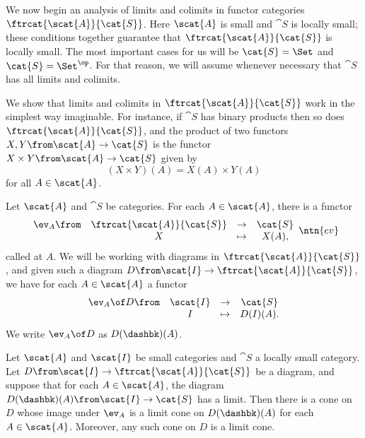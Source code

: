 We now begin an analysis of limits and colimits in functor categories
$\ftrcat{\scat{A}}{\cat{S}}$.  Here $\scat{A}$ is small and $\cat{S}$ is
locally small; these conditions together guarantee that
$\ftrcat{\scat{A}}{\cat{S}}$ is locally small.  The most important cases
for us will be $\cat{S} = \Set$ and $\cat{S} = \Set^\op$.  For that reason,
we will assume whenever necessary that $\cat{S}$ has all limits and
colimits.

We show that limits and colimits in $\ftrcat{\scat{A}}{\cat{S}}$ work in
the simplest way imaginable.  For instance, if $\cat{S}$ has binary products
then so does $\ftrcat{\scat{A}}{\cat{S}}$, and the product%
%
%
of two functors $X, Y\from \scat{A} \to \cat{S}$ is the functor $X \times
Y\from \scat{A} \to \cat{S}$ given by
\[
(X \times Y)(A) = X(A) \times Y(A)
\]
for all $A \in \scat{A}$.  

\begin{notn}
Let $\scat{A}$ and $\cat{S}$ be categories.  For each $A \in \scat{A}$, there
is a functor
\[
\begin{array}{cccc}
\ev_A\from      &\ftrcat{\scat{A}}{\cat{S}}     &
\to             &\cat{S}        \\
                &X                              &
\mapsto         &X(A),
\end{array}%
%
\ntn{ev}
%
\]
called %
%
%
at $A$.  We will be working with diagrams in $\ftrcat{\scat{A}}{\cat{S}}$,
and given such a diagram $D\from \scat{I} \to \ftrcat{\scat{A}}{\cat{S}}$,
we have for each $A \in \scat{A}$ a functor
\[
\begin{array}{cccc}
\ev_A \of D\from&\scat{I}       &\to            &\cat{S}        \\
                &I              &\mapsto        &D(I)(A).        
\end{array}
\]
We write $\ev_A \of D$ as $D(\dashbk)(A)$.%
%
%
\end{notn}

\begin{thm}
\label{thm:pw}
Let $\scat{A}$ and $\scat{I}$ be small categories and $\cat{S}$ a locally
small category.  Let $D\from \scat{I} \to \ftrcat{\scat{A}}{\cat{S}}$ be a
diagram, and suppose that for each $A \in \scat{A}$, the diagram
$D(\dashbk)(A)\from \scat{I} \to \cat{S}$ has a limit.  Then there is a
cone on $D$ whose image under $\ev_A$ is a limit cone on $D(\dashbk)(A)$
for each $A \in \scat{A}$.  Moreover, any such cone on $D$ is a limit cone.
\end{thm}

